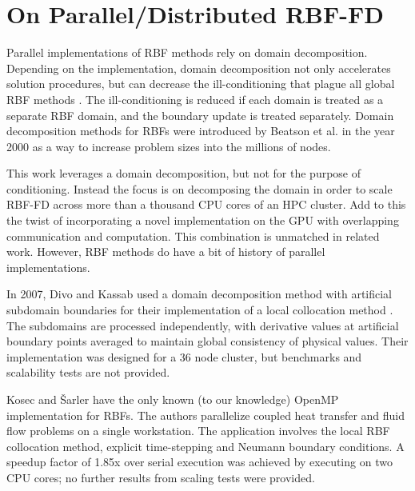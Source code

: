 \documentclass[11pt]{report}
\begin{document}
{%

\section{On Parallel/Distributed RBF-FD} 

Parallel implementations of RBF methods rely on domain decomposition. Depending on the implementation, domain decomposition not only accelerates solution procedures, but can decrease the ill-conditioning that plague all global RBF methods \cite{Divo2007}. The ill-conditioning is reduced if each domain is treated as a separate RBF domain, and the boundary update is treated separately. Domain decomposition methods for RBFs were introduced by Beatson et al. \cite{Beatson2000} in the year 2000 as a way to increase problem sizes into the millions of nodes.

This work leverages a domain decomposition, but not for the purpose of conditioning. Instead the focus is on decomposing the domain in order to scale RBF-FD across more than a thousand CPU cores of an HPC cluster. Add to this the twist of incorporating a novel implementation on the GPU with overlapping communication and computation. This combination is unmatched in related work. However, RBF methods do have a bit of history of parallel implementations. 

In 2007, Divo and Kassab \cite{Divo2007} used a domain decomposition method with artificial 
subdomain boundaries for their implementation of a local collocation method \cite{Divo2007}. 
The subdomains are processed independently, with derivative values 
at artificial boundary points averaged to maintain global consistency of physical values. Their implementation 
was designed for a 36 node cluster, but benchmarks and scalability tests are not provided.



Kosec and \v{S}arler \cite{Kosec2008} have the only known (to our knowledge) OpenMP implementation for RBFs. The authors parallelize coupled heat transfer 
and fluid flow problems on a single workstation. 
The application involves the local RBF collocation method, explicit time-stepping and Neumann boundary conditions. A speedup 
factor of 1.85x over serial execution was achieved by executing on two CPU cores; no further 
results from scaling tests were provided. 

}
\end{document}

